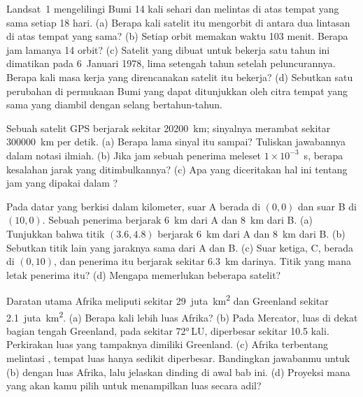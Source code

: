 \begin{exercise}[$\star\star$]\label{exo:g9:maps-of-the-earth:9}
Landsat~1 mengelilingi Bumi 14 kali sehari dan melintas di atas tempat
yang sama setiap 18 hari. (a) Berapa kali satelit itu mengorbit di antara
dua lintasan di atas tempat yang sama? (b) Setiap orbit memakan waktu 103
menit. Berapa jam lamanya 14 orbit? (c) Satelit yang dibuat untuk bekerja
satu tahun ini dimatikan pada 6~Januari 1978, lima setengah tahun setelah
peluncurannya. Berapa kali masa kerja yang direncanakan satelit itu
bekerja? (d) Sebutkan satu perubahan di permukaan Bumi yang dapat
ditunjukkan oleh citra tempat yang sama yang diambil dengan selang
bertahun-tahun.
\end{exercise}

\begin{exercise}[$\star\star$]\label{exo:g9:maps-of-the-earth:10}
Sebuah satelit GPS berjarak sekitar \qty{20200}{km}; sinyalnya merambat
sekitar \qty{300000}{km} per detik. (a) Berapa lama sinyal itu sampai?
Tuliskan jawabannya dalam notasi ilmiah. (b) Jika jam sebuah penerima
meleset $1 \times 10^{-3}$~s, berapa kesalahan jarak yang ditimbulkannya?
(c) Apa yang diceritakan hal ini tentang jam yang dipakai dalam ?
\end{exercise}

\begin{exercise}[$\star\star\star$]\label{exo:g9:maps-of-the-earth:11}
Pada  datar yang berkisi dalam kilometer, suar A berada di $(0, 0)$
dan suar B di $(10, 0)$. Sebuah penerima berjarak \qty{6}{km} dari A dan
\qty{8}{km} dari B. (a) Tunjukkan bahwa titik $(3.6, 4.8)$ berjarak
\qty{6}{km} dari A dan \qty{8}{km} dari B. (b) Sebutkan titik lain yang
jaraknya sama dari A dan B. (c) Suar ketiga, C, berada di $(0, 10)$, dan
penerima itu berjarak sekitar \qty{6.3}{km} darinya. Titik yang mana
letak penerima itu? (d) Mengapa  memerlukan
beberapa satelit?
\end{exercise}

\begin{exercise}[$\star\star\star$]\label{exo:g9:maps-of-the-earth:12}
Daratan utama Afrika meliputi sekitar 29~juta~\unit{km^2} dan Greenland
sekitar 2.1~juta~\unit{km^2}. (a) Berapa kali lebih luas Afrika? (b) Pada
 Mercator, luas di dekat bagian tengah Greenland, pada sekitar
\ang{72}\,LU, diperbesar sekitar 10.5 kali. Perkirakan luas yang tampaknya
dimiliki Greenland. (c) Afrika terbentang melintasi , tempat
luas hanya sedikit diperbesar. Bandingkan jawabanmu untuk (b) dengan luas
Afrika, lalu jelaskan  dinding di awal bab ini. (d) Proyeksi mana yang
akan kamu pilih untuk menampilkan luas  secara adil?
\end{exercise}

